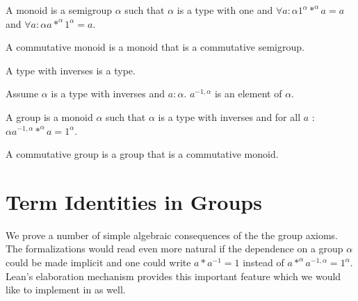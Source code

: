 \documentclass{article}
\begin{document}
\begin{forthel}
\begin{definition}
A monoid is a semigroup $\alpha$ such that $\alpha$ is a type
with one and
$\forall a : \alpha 1^{\alpha} *^{\alpha} a = a$ and
$\forall a : \alpha a *^{\alpha} 1^{\alpha} = a$.
\end{definition}

\begin{definition}
A commutative monoid is a monoid that
is a commutative semigroup.
\end{definition}

\begin{signature}
A type with inverses is a type.
\end{signature}

\begin{signature}
Assume $\alpha$ is a type with inverses and $a : \alpha$.
$a^{-1,\alpha}$ is an element of $\alpha$.
\end{signature}

\begin{definition}
A group is a monoid $\alpha$ such that $\alpha$ is a type
with inverses and
for all $a$ : $\alpha a^{-1,\alpha} *^{\alpha} a = 1^{\alpha}$.
\end{definition}

\begin{definition}
A commutative group is a group that is a commutative
monoid.
\end{definition}

\end{forthel}


\section{Term Identities in Groups}

We prove a number of simple algebraic consequences of the the
group axioms. The formalizations would read even more natural
if the dependence on a group $\alpha$ could be made implicit
and one could write $a * a^{-1} = 1$ instead of
$a *^{\alpha} a^{-1,\alpha} = 1^{\alpha}$.
Lean's elaboration mechanism provides this important feature
which we would like to implement in \Naproche{} as well. \\
\end{document}
